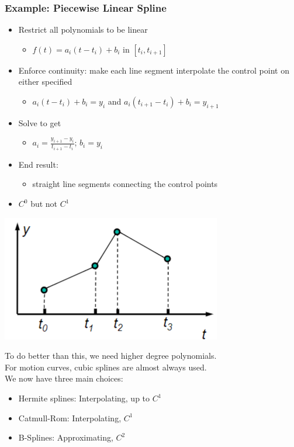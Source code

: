 \documentclass{article}
\begin{document}
\subsubsection*{Example: Piecewise Linear Spline}
\begin{itemize}
    \item Restrict all polynomials to be linear
    \begin{itemize}
        \item $f(t) = a_i (t - t_i) + b_i$ in $[t_i, t_{i + 1}]$
    \end{itemize}
    \item Enforce continuity: make each line segment interpolate the control point on either specified
    \begin{itemize}
        \item $a_i (t - t_i) + b_i = y_i$ and $a_i (t_{i + 1} - t_i) + b_i = y_{i + 1}$
    \end{itemize}
    \item Solve to get
    \begin{itemize}
        \item $a_i = \frac{y_{i + 1} - y_i}{t_{i + 1} - t_i}$; $b_i = y_i$
    \end{itemize}
    \item End result:
    \begin{itemize}
        \item straight line segments connecting the control points
    \end{itemize}
    \item $C^0$ but not $C^1$
\end{itemize}
\begin{center}
    \includegraphics*[scale=1]{W3_10.png}
\end{center}
To do better than this, we need higher degree polynomials.\\
For motion curves, cubic splines are almost always used.\\
We now have three main choices:
\begin{itemize}
    \item Hermite splines: Interpolating, up to $C^1$
    \item Catmull-Rom: Interpolating, $C^1$
    \item B-Splines: Approximating, $C^2$
\end{itemize}
\end{document}
